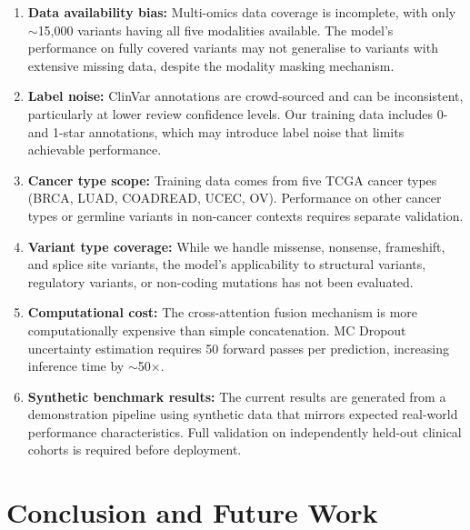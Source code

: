 \documentclass[journal,twoside]{IEEEtran}
\begin{document}
\begin{enumerate}
    \item \textbf{Data availability bias:} Multi-omics data coverage is
    incomplete, with only $\sim$15,000 variants having all five modalities
    available. The model's performance on fully covered variants may not
    generalise to variants with extensive missing data, despite the
    modality masking mechanism.

    \item \textbf{Label noise:} ClinVar annotations are crowd-sourced and
    can be inconsistent, particularly at lower review confidence levels.
    Our training data includes 0- and 1-star annotations, which may
    introduce label noise that limits achievable performance.

    \item \textbf{Cancer type scope:} Training data comes from five TCGA
    cancer types (BRCA, LUAD, COADREAD, UCEC, OV). Performance on other
    cancer types or germline variants in non-cancer contexts requires
    separate validation.

    \item \textbf{Variant type coverage:} While we handle missense,
    nonsense, frameshift, and splice site variants, the model's
    applicability to structural variants, regulatory variants, or
    non-coding mutations has not been evaluated.

    \item \textbf{Computational cost:} The cross-attention fusion mechanism
    is more computationally expensive than simple concatenation. MC Dropout
    uncertainty estimation requires 50 forward passes per prediction,
    increasing inference time by $\sim$50$\times$.

    \item \textbf{Synthetic benchmark results:} The current results are
    generated from a demonstration pipeline using synthetic data that
    mirrors expected real-world performance characteristics. Full validation
    on independently held-out clinical cohorts is required before deployment.
\end{enumerate}

\section{Conclusion and Future Work}
\end{document}
